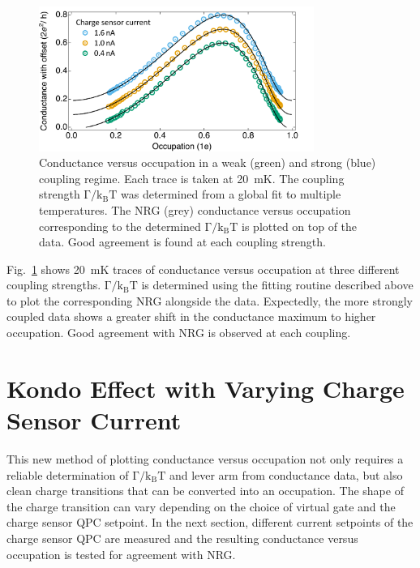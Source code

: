 \begin{figure}[!bht]
 \begin{center}
 \includegraphics[width=0.8\textwidth]{figures/ch3/figure15.pdf}
 \caption[Conductance versus Occupation : Varying Coupling Strength]{\label{fig:ch3/cond_occ_couplingstrength} 
 Conductance versus occupation in a weak (green) and strong (blue) coupling regime. Each trace is taken at \qty{20}{mK}. The coupling strength $\mathrm{\Gamma/k_BT}$ was determined from a global fit to multiple temperatures. The NRG (grey) conductance versus occupation corresponding to the determined $\mathrm{\Gamma/k_BT}$ is plotted on top of the data. Good agreement is found at each coupling strength.}
 \end{center}
\end{figure}


Fig.~\ref{fig:ch3/cond_occ_couplingstrength} shows \qty{20}{mK} traces of conductance versus occupation at three different coupling strengths. $\mathrm{\Gamma/k_BT}$ is determined using the fitting routine described above to plot the corresponding NRG alongside the data. Expectedly, the more strongly coupled data shows a greater shift in the conductance maximum to higher occupation. Good agreement with NRG is observed at each coupling.







\section{Kondo Effect with Varying Charge Sensor Current}

This new method of plotting conductance versus occupation not only requires a reliable determination of $\mathrm{\Gamma/k_BT}$ and lever arm from conductance data, but also clean charge transitions that can be converted into an occupation. The shape of the charge transition can vary depending on the choice of virtual gate and the charge sensor QPC setpoint. In the next section, different current setpoints of the charge sensor QPC are measured and the resulting conductance versus occupation is tested for agreement with NRG.



